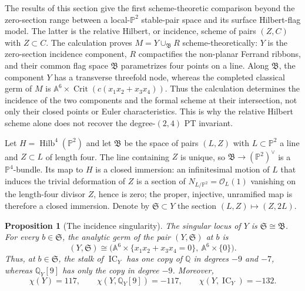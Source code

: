 \documentclass[11pt,reqno]{amsart}
\newtheorem{proposition}[theorem]{Proposition}
\theoremstyle{definition}
\newcommand{\Q}{\mathbb Q}
\newcommand{\Pp}{\mathbb P}
\newcommand{\Ocal}{\mathcal O}
\newcommand{\IC}{\operatorname{IC}}
\newcommand{\Hilb}{\operatorname{Hilb}}
\begin{document}
The results of this section give the first scheme-theoretic
comparison beyond the zero-section range between a local-$\Pp^2$
stable-pair space and its surface Hilbert-flag model.  The latter is the
relative Hilbert, or incidence, scheme of pairs $(Z,C)$ with $Z\subset C$.
The calculation proves $M=Y\cup_{\mathfrak B}R$ scheme-theoretically: $Y$
is the zero-section incidence component, $R$ compactifies the non-planar
Ferrand ribbons, and their common flag space $\mathfrak B$ parametrizes four
points on a line.  Along $\mathfrak B$, the component $Y$ has a transverse
threefold node, whereas the completed classical germ of $M$ is
$\mathbb A^6\times\operatorname{Crit}(c(x_1x_2+x_3x_4))$.  Thus the
calculation determines the incidence of the two components and the formal
scheme at their
intersection, not only their closed points or Euler characteristics.  This
is why the relative Hilbert scheme alone does not recover the degree-$(2,4)$ PT
invariant.

Let $H=\Hilb^4(\Pp^2)$ and let $\mathfrak B$ be the space of pairs
$(L,Z)$ with $L\subset\Pp^2$ a line and $Z\subset L$ of length four.
The line containing $Z$ is unique, so $\mathfrak B\to(\Pp^2)^\vee$ is a
$\Pp^4$-bundle.  Its map to $H$ is a closed immersion: an infinitesimal
motion of $L$ that induces the trivial deformation of $Z$ is a section of
$N_{L/\Pp^2}=\Ocal_L(1)$ vanishing on the length-four divisor $Z$, hence is
zero; the proper, injective, unramified map is therefore a closed immersion.
Denote by
$\mathfrak S\subset Y$ the section
$(L,Z)\mapsto(Z,2L)$.

\begin{proposition}[The incidence singularity]\label{prop:conic-correction-node}
The singular locus of $Y$ is $\mathfrak S\cong\mathfrak B$.  For every
$b\in\mathfrak S$, the analytic germ of the pair $(Y,\mathfrak S)$ at $b$
is
\[
 (Y,\mathfrak S)\cong
 \bigl(\mathbb A^6\times
       \{x_1x_2+x_3x_4=0\},\ \mathbb A^6\times\{0\}\bigr).
\]
Thus, at $b\in\mathfrak S$, the stalk of $\IC_Y$ has one copy of $\Q$ in
degrees $-9$ and $-7$, whereas $\Q_Y[9]$ has only the copy in degree
$-9$.  Moreover,
\[
 \chi(Y)=117,\qquad
 \chi(Y,\Q_Y[9])=-117,\qquad
 \chi(Y,\IC_Y)=-132.
\]
\end{proposition}
\end{document}
